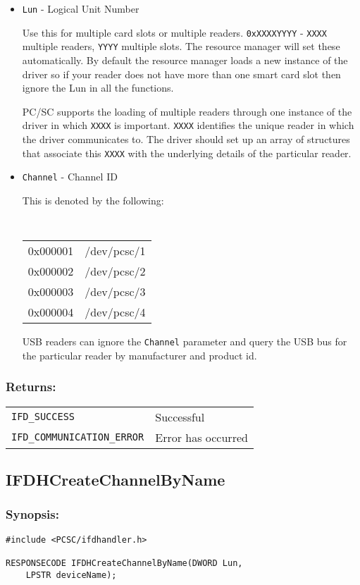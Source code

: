 \documentclass[a4paper,12pt]{article}
\newcommand{\synopsis}{\subsubsection{Synopsis:}}
\newcommand{\returns}{\subsubsection{Returns:}}
\begin{document}
\begin{itemize}
\item \texttt{Lun} - Logical Unit Number

Use this for multiple card slots or multiple readers.
\texttt{0xXXXXYYYY} - \texttt{XXXX} multiple readers, \texttt{YYYY}
multiple slots. The resource manager will set these automatically. By
default the resource manager loads a new instance of the driver so if
your reader does not have more than one smart card slot then ignore the
Lun in all the functions.

PC/SC supports the loading of multiple readers through one instance of
the driver in which \texttt{XXXX} is important. \texttt{XXXX} identifies
the unique reader in which the driver communicates to. The driver should
set up an array of structures that associate this \texttt{XXXX} with the
underlying details of the particular reader.

\item \texttt{Channel} - Channel ID

This is denoted by the following:

{\tt
\begin{tabular}{ll}
0x000001 & /dev/pcsc/1\\
0x000002 & /dev/pcsc/2\\
0x000003 & /dev/pcsc/3\\
0x000004 & /dev/pcsc/4\\
\end{tabular}
}

USB readers can ignore the \texttt{Channel} parameter and query the USB
bus for the particular reader by manufacturer and product id.

\end{itemize}

\returns

\begin{tabular}{ll}
\texttt{IFD\_SUCCESS} & Successful\\
\texttt{IFD\_COMMUNICATION\_ERROR} & Error has occurred
\end{tabular}


\subsection{IFDHCreateChannelByName}
\label{IFDHCreateChannelByName}

\synopsis
\begin{verbatim}
#include <PCSC/ifdhandler.h>

RESPONSECODE IFDHCreateChannelByName(DWORD Lun,
    LPSTR deviceName);
\end{verbatim}
\end{document}
